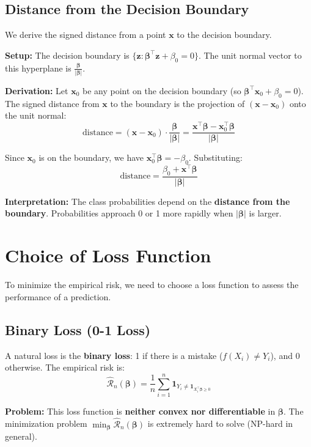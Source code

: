 \documentclass[main.tex]{subfiles}
\begin{document}
\subsection{Distance from the Decision Boundary}

We derive the signed distance from a point $\mathbf{x}$ to the decision boundary.

\textbf{Setup:} The decision boundary is $\{\mathbf{z} : \boldsymbol{\beta}^\top \mathbf{z} + \beta_0 = 0\}$. The unit normal vector to this hyperplane is $\frac{\boldsymbol{\beta}}{|\boldsymbol{\beta}|}$.

\textbf{Derivation:} Let $\mathbf{x}_0$ be any point on the decision boundary (so $\boldsymbol{\beta}^\top \mathbf{x}_0 + \beta_0 = 0$). The signed distance from $\mathbf{x}$ to the boundary is the projection of $(\mathbf{x} - \mathbf{x}_0)$ onto the unit normal:
$$\text{distance} = (\mathbf{x} - \mathbf{x}_0) \cdot \frac{\boldsymbol{\beta}}{|\boldsymbol{\beta}|} = \frac{\mathbf{x}^\top \boldsymbol{\beta} - \mathbf{x}_0^\top \boldsymbol{\beta}}{|\boldsymbol{\beta}|}$$

Since $\mathbf{x}_0$ is on the boundary, we have $\mathbf{x}_0^\top \boldsymbol{\beta} = -\beta_0$. Substituting:
$$\boxed{\text{distance} = \frac{\beta_0 + \mathbf{x}^\top \boldsymbol{\beta}}{|\boldsymbol{\beta}|}}$$

\textbf{Interpretation:} The class probabilities depend on the \textbf{distance from the boundary}. Probabilities approach 0 or 1 more rapidly when $|\boldsymbol{\beta}|$ is larger.

\section{Choice of Loss Function}

To minimize the empirical risk, we need to choose a loss function to assess the performance of a prediction.

\subsection{Binary Loss (0-1 Loss)}

A natural loss is the \textbf{binary loss}: 1 if there is a mistake ($f(X_i) \neq Y_i$), and 0 otherwise. The empirical risk is:
$$\hat{\mathcal{R}}_n(\boldsymbol{\beta}) = \frac{1}{n} \sum_{i=1}^{n} \mathbf{1}_{Y_i \neq \mathbf{1}_{X_i^\top \boldsymbol{\beta} \geq 0}}$$

\textbf{Problem:} This loss function is \textbf{neither convex nor differentiable} in $\boldsymbol{\beta}$. The minimization problem $\min_{\boldsymbol{\beta}} \hat{\mathcal{R}}_n(\boldsymbol{\beta})$ is extremely hard to solve (NP-hard in general).
\end{document}
